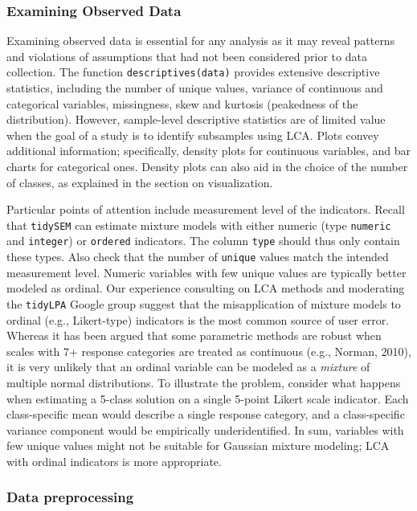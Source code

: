 \documentclass[
  ,man,floatsintext]{apa6}
\begin{document}
\hypertarget{examining-observed-data}{%
\subsubsection{Examining Observed Data}\label{examining-observed-data}}

Examining observed data is essential for any analysis as it may reveal
patterns and violations of assumptions that had not been considered
prior to data collection.
The function \texttt{descriptives(data)} provides extensive descriptive statistics,
including the number of unique values,
variance of continuous and categorical variables,
missingness, skew and kurtosis (peakedness of the distribution).
However, sample-level descriptive statistics are of limited value when the goal of a study is to identify subsamples using LCA.
Plots convey additional information; specifically, density plots for continuous variables, and bar charts
for categorical ones.
Density plots can also aid in the choice of the number of classes, as explained in the section on visualization.

Particular points of attention include measurement level of the indicators.
Recall that \texttt{tidySEM} can estimate mixture models with either numeric (type \texttt{numeric} and \texttt{integer}) or \texttt{ordered} indicators.
The column \texttt{type} should thus only contain these types.
Also check that the number of \texttt{unique} values match the intended measurement level.
Numeric variables with few unique values are typically better modeled as ordinal.
Our experience consulting on LCA methods
and moderating the \texttt{tidyLPA} Google group suggest that the
misapplication of mixture models to ordinal (e.g., Likert-type)
indicators is the most common source of user error. Whereas it has been
argued that some parametric methods are robust when scales with 7+
response categories are treated as continuous (e.g., Norman, 2010),
it is very unlikely
that an ordinal variable can be modeled as a \emph{mixture} of multiple
normal distributions.
To illustrate the problem, consider what happens when estimating a 5-class solution on a single 5-point Likert scale indicator.
Each class-specific mean would describe a single response
category,
and a class-specific variance component would be empirically underidentified.
In sum, variables with few unique values might not be suitable for Gaussian mixture modeling;
LCA with ordinal indicators is more appropriate.

\hypertarget{data-preprocessing}{%
\subsubsection{Data preprocessing}\label{data-preprocessing}}
\end{document}
